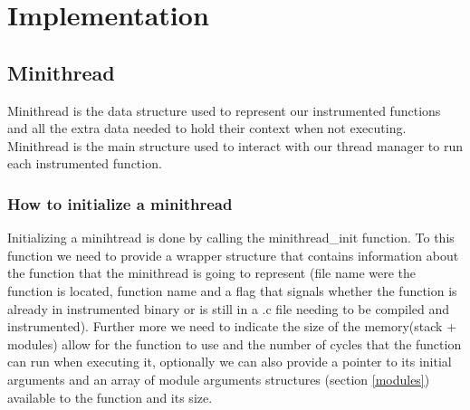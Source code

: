 \documentclass[12pt,a4paper]{report}
\begin{document}
\chapter{Implementation}

\section{Minithread}
Minithread is the data structure used to represent our instrumented functions and all the extra data needed to hold their context when not executing. Minithread is the main structure used to interact with our thread manager to run each instrumented function. 

\subsection{How to initialize a minithread} \label{init minithread}
Initializing a minihtread is done by calling the minithread\_init function. To this function we need to provide a wrapper structure that contains information about the function that the minithread is going to represent (file name were the function is located, function name and a flag that signals whether the function is already in instrumented binary or is still in a .c file needing to be compiled and instrumented). Further more we need to indicate the size of the memory(stack + modules) allow for the function to use and the number of cycles that the function can run when executing it, optionally we can also provide a pointer to its initial arguments and an array of module arguments structures (section \ref{modules}) available to the function and its size.  
\end{document}
